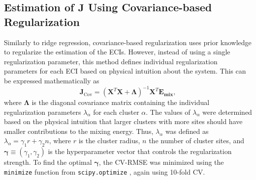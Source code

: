 \documentclass[a4paper, 12pt]{article}
\begin{document}
\subsection{Estimation of \texorpdfstring{$\bm{J}$}{J} Using Covariance-based Regularization}
Similarly to ridge regression, covariance-based regularization uses prior knowledge to regularize the estimation of the ECIs. However, instead of using a single regularization parameter, this method defines individual regularization parameters for each ECI based on physical intuition about the system. This can be expressed mathematically as
\begin{equation}
  \bm{J}_{\text{Cov}} = \left ( \bm{X}^T \bm{X} + \bm{\Lambda} \right )^{-1} \bm{X}^T \bm{E_\text{mix}},
\end{equation}
where $\bm{\Lambda}$ is the diagonal covariance matrix containing the individual regularization parameters $\lambda_\alpha$ for each cluster $\alpha$. The values of $\lambda_\alpha$ were determined based on the physical intuition that larger clusters with more sites should have smaller contributions to the mixing energy. Thus, $\lambda_\alpha$ was defined as $\lambda_\alpha = \gamma_1 r + \gamma_2 n$, where $r$ is the cluster radius, $n$ the number of cluster sites, and $\bm{\gamma} \equiv (\gamma_1, \gamma_2)$ is the hyperparameter vector that controls the regularization strength. To find the optimal $\bm{\gamma}$, the CV-RMSE was minimized using the \texttt{minimize} function from \texttt{scipy.optimize} \cite{2020SciPy-NMeth}, again using 10-fold CV. 
\end{document}
